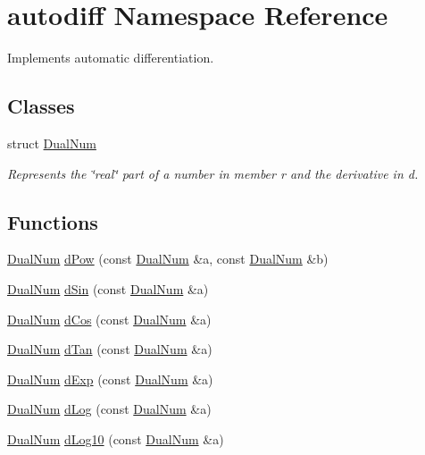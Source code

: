 \hypertarget{namespaceautodiff}{\section{autodiff Namespace Reference}
\label{namespaceautodiff}
}


Implements automatic differentiation.  


\subsection*{Classes}
\begin{DoxyCompactItemize}
\item 
struct \hyperlink{structautodiff_1_1_dual_num}{Dual\-Num}
\begin{DoxyCompactList}\small\item\em Represents the \char`\"{}real\char`\"{} part of a number in member {\ttfamily r} and the derivative in {\ttfamily d}. \end{DoxyCompactList}\end{DoxyCompactItemize}
\subsection*{Functions}
\begin{DoxyCompactItemize}
\item 
\hyperlink{structautodiff_1_1_dual_num}{Dual\-Num} \hyperlink{namespaceautodiff_a19b889e35f523cc6ca0f377dc8bed262}{d\-Pow} (const \hyperlink{structautodiff_1_1_dual_num}{Dual\-Num} \&a, const \hyperlink{structautodiff_1_1_dual_num}{Dual\-Num} \&b)
\item 
\hyperlink{structautodiff_1_1_dual_num}{Dual\-Num} \hyperlink{namespaceautodiff_a0f6df25515f7f05f838a9fd96f53fd37}{d\-Sin} (const \hyperlink{structautodiff_1_1_dual_num}{Dual\-Num} \&a)
\item 
\hyperlink{structautodiff_1_1_dual_num}{Dual\-Num} \hyperlink{namespaceautodiff_a49d66a6f54fffb4250795cc589158a14}{d\-Cos} (const \hyperlink{structautodiff_1_1_dual_num}{Dual\-Num} \&a)
\item 
\hyperlink{structautodiff_1_1_dual_num}{Dual\-Num} \hyperlink{namespaceautodiff_a4bdb0754d9ad8a5c4aba2d7ea9f040db}{d\-Tan} (const \hyperlink{structautodiff_1_1_dual_num}{Dual\-Num} \&a)
\item 
\hyperlink{structautodiff_1_1_dual_num}{Dual\-Num} \hyperlink{namespaceautodiff_af2706967e031d3472b823760b0c67dcb}{d\-Exp} (const \hyperlink{structautodiff_1_1_dual_num}{Dual\-Num} \&a)
\item 
\hyperlink{structautodiff_1_1_dual_num}{Dual\-Num} \hyperlink{namespaceautodiff_a003e7455b4727bad71fdb9b6bc676e86}{d\-Log} (const \hyperlink{structautodiff_1_1_dual_num}{Dual\-Num} \&a)
\item 
\hyperlink{structautodiff_1_1_dual_num}{Dual\-Num} \hyperlink{namespaceautodiff_a656dafc1fc9422d40ade97d24905f875}{d\-Log10} (const \hyperlink{structautodiff_1_1_dual_num}{Dual\-Num} \&a)
\end{DoxyCompactItemize}
